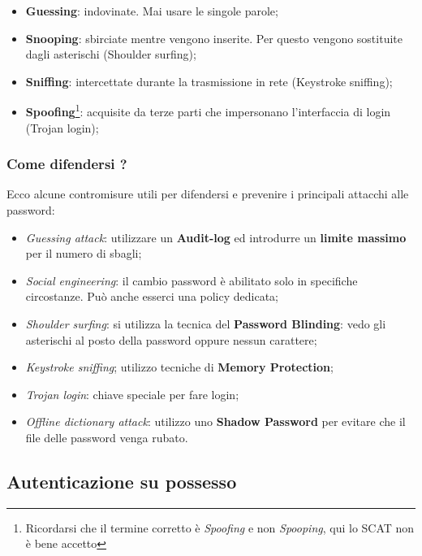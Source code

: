 \begin{itemize}
      \item \textbf{Guessing}: indovinate. Mai usare le singole parole;
      \item \textbf{Snooping}: sbirciate mentre vengono inserite.
            Per questo vengono sostituite dagli asterischi
            (Shoulder surfing);
      \item \textbf{Sniffing}: intercettate durante la trasmissione in rete
            (Keystroke sniffing);
      \item \textbf{Spoofing}\footnote{Ricordarsi che il termine corretto è
                  \textit{Spoofing} e non \textit{Spooping}, qui lo SCAT non è bene
                  accetto }: acquisite da terze parti che impersonano
            l’interfaccia di login (Trojan login);

\end{itemize}

\subsubsection{Come difendersi ?}

Ecco alcune contromisure utili per difendersi e prevenire i principali attacchi
alle password:

\begin{itemize}
      \item \textit{Guessing attack}:
            utilizzare un \textbf{Audit-log} ed introdurre un
            \textbf{limite massimo} per il numero di sbagli;
      \item \textit{Social engineering}: il cambio password è abilitato solo in
            specifiche circostanze.
            Può anche esserci una policy dedicata;
      \item \textit{Shoulder surfing}: si utilizza la tecnica del
            \textbf{Password Blinding}: vedo gli asterischi al posto della
            password oppure nessun carattere;
      \item \textit{Keystroke sniffing}; utilizzo tecniche di
            \textbf{Memory Protection};
      \item \textit{Trojan login}: chiave speciale per fare login;
      \item \textit{Offline dictionary attack}: utilizzo uno
            \textbf{Shadow Password} per evitare che
            il file delle password venga rubato.
\end{itemize}

\subsection{Autenticazione su possesso}

